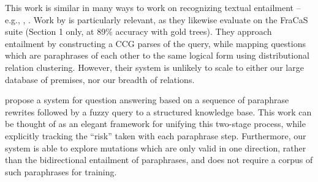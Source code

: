 This work is similar in many ways to work on 
  recognizing textual entailment -- e.g., 
  , .
Work by  is particularly relevant,
  as they likewise evaluate on the FraCaS suite (Section 1 only, at
  89\% accuracy with gold trees).
They approach entailment by constructing a CCG parses of the query,
  while mapping questions which are paraphrases of each other to the
  same logical form using distributional relation clustering.
However, their system is unlikely to scale to either our large
  database of premises, nor our breadth of relations.

 propose a system for question answering
  based on a sequence of paraphrase rewrites followed by a fuzzy query to
  a structured knowledge base.
This work can be thought of as an elegant framework for unifying this
  two-stage process, while explicitly tracking the ``risk'' taken with
  each paraphrase step.
Furthermore, our system is able to explore mutations which are only
  valid in one direction, rather than the bidirectional entailment of
  paraphrases, and does not require a corpus of such paraphrases for
  training.
  
